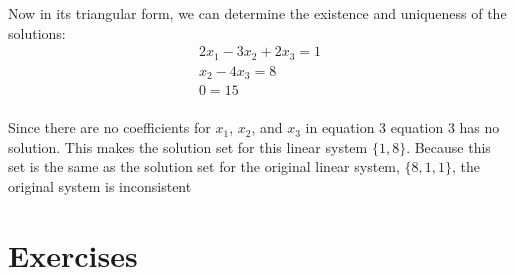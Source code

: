 \documentclass[12pt letter]{report}
\begin{document}
{{    Now in its triangular form, we can determine the existence and uniqueness of the solutions:
    \begin{align*}
      2x_1 - 3x_2 + 2x_3 = 1 \\
      x_2 - 4x_3 = 8         \\
      0 = 15                 \\
    \end{align*}

    Since there are no coefficients for $x_1$, $x_2$, and $x_3$ in equation 3 equation 3 has no solution. This makes the
    solution set for this linear system $\{1, 8\}$. Because this set is the same as the solution set for the original
    linear system, $\{8, 1, 1\} $, the original system is inconsistent


  }
}

\section{Exercises}


\end{document}
